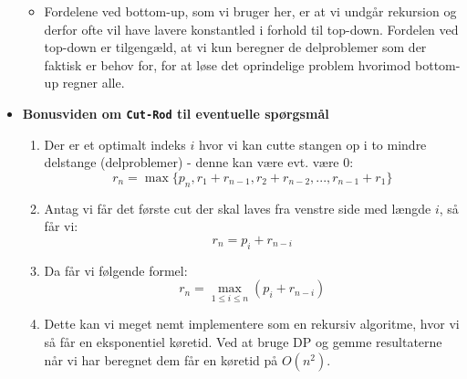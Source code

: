 \begin{itemize}
\begin{itemize}
\item Fordelene ved bottom-up, som vi bruger her, er at vi undgår rekursion og derfor ofte vil have lavere konstantled i forhold til top-down. Fordelen ved top-down er tilgengæld, at vi kun beregner de delproblemer som der faktisk er behov for, for at løse det oprindelige problem hvorimod bottom-up regner alle.


\end{itemize}


\item \textbf{Bonusviden om \texttt{Cut-Rod} til eventuelle spørgsmål}
\begin{enumerate}
	\item Der er et optimalt indeks $i$ hvor vi kan cutte stangen op i to mindre delstange (delproblemer) - denne kan være evt. være $0$:
	$$
	r_n = \max\{p_n, r_1 + r_{n-1}, r_2 + r_{n-2}, ..., r_{n-1} + r_1\}
	$$
	\item Antag vi får det første cut der skal laves fra venstre side med længde $i$, så får vi:
	$$
	r_n = p_i + r_{n-i}
	$$
	\item Da får vi følgende formel:
	$$
	r_n = \max\limits_{1 \leq i \leq n}(p_i + r_{n-i})
	$$
	\item Dette kan vi meget nemt implementere som en rekursiv algoritme, hvor vi så får en eksponentiel køretid. Ved at bruge DP og gemme resultaterne når vi har beregnet dem får en køretid på $O(n^2)$.
\end{enumerate}

\end{itemize}
